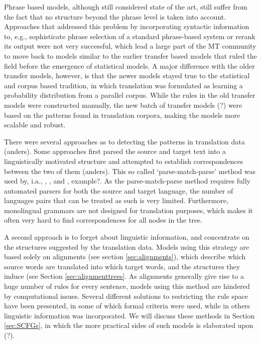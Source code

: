 \documentclass{report}
\theoremstyle{definition}
\theoremstyle{plain}
\begin{document}
Phrase based models, although still considered state of the art, still suffer from the fact that no structure beyond the phrase level is taken into account. Approaches that addressed this problem by incorporating syntactic information to, e.g., sophisticate phrase selection of a standard phrase-based system \citep{koehn2003statistical} or rerank its output \citep{och2004alignment} were not very successful, which lead a large part of the MT community to move back to models similar to the earlier transfer based models that ruled the field before the emergence of statistical models. A major difference with the older transfer models, however, is that the newer models stayed true to the statistical and corpus based tradition, in which translation was formulated as learning a probability distribution from a parallel corpus. While the rules in the old transfer models were constructed manually, the new batch of transfer models (?) were based on the patterns found in translation corpora, making the models more scalable and robust.

There were several approaches as to detecting the patterns in translation data (anders). Some approaches first parsed the source and target text into a linguistically motivated structure and attempted to establish correspondences between the two of them (anders). This so called `parse-match-parse' method was used by, i.a., \cite{poutsma2000data}, \cite{galley2004s}, \cite{galley2006scalable} and \cite{melamed2004generalized,melamed2004statistical}, example?. As the parse-match-parse method requires fully automated parsers for both the source and target language, the number of languages pairs that can be treated as such is very limited. Furthermore, monolingual grammars are not designed for translation purposes, which makes it often very hard to find correspondences for all nodes in the tree.

A second approach is to forget about linguistic information, and concentrate on the structures suggested by the translation data. Models using this strategy are based solely on alignments (see section \ref{sec:alignments}), which describe which source words are translated into which target words, and the structures they induce (see Section \ref{sec:alignmenttrees}. As alignments generally give rise to a huge number of rules for every sentence, models using this method are hindered by computational issues. Several different solutions to restricting the rule space have been presented, in some of which formal criteria were used, while in others linguistic information was incorporated. We will discuss these methods in Section \ref{sec:SCFGs}, in which the more practical sides of such models is elaborated upon (?).
\end{document}
